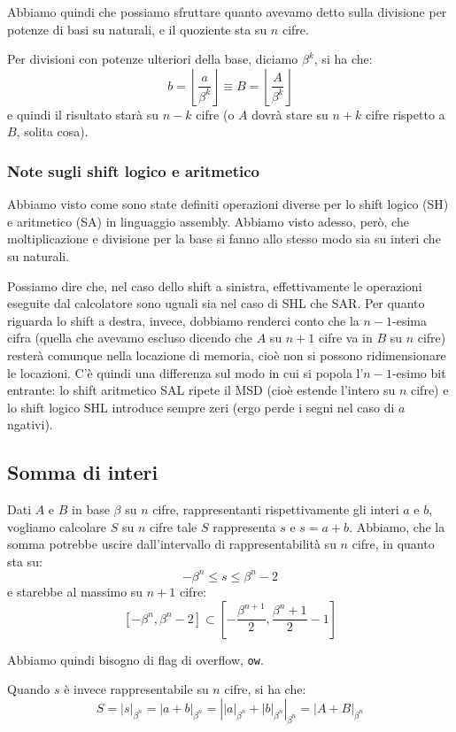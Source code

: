 \documentclass[a4paper,11pt]{article}
\begin{document}
Abbiamo quindi che possiamo sfruttare quanto avevamo detto sulla divisione per potenze di basi su naturali, e il quoziente sta su $n$ cifre.

Per divisioni con potenze ulteriori della base, diciamo $\beta^k$, si ha che:
$$
b = \left\lfloor \frac{a}{\beta^k} \right\rfloor \equiv B = \left\lfloor \frac{A}{\beta^k} \right\rfloor 
$$
e quindi il risultato starà su $n - k$ cifre (o $A$ dovrà stare su $n + k$ cifre rispetto a $B$, solita cosa).

\subsubsection{Note sugli shift logico e aritmetico}
Abbiamo visto come sono state definiti operazioni diverse per lo shift logico (SH) e aritmetico (SA) in linguaggio assembly.
Abbiamo visto adesso, però, che moltiplicazione e divisione per la base si fanno allo stesso modo sia su interi che su naturali.

Possiamo dire che, nel caso dello shift a sinistra, effettivamente le operazioni eseguite dal calcolatore sono uguali sia nel caso di SHL che SAR.
Per quanto riguarda lo shift a destra, invece, dobbiamo renderci conto che la $n-1$-esima cifra (quella che avevamo escluso dicendo che $A$ su $n+1$ cifre va in $B$ su $n$ cifre) resterà comunque nella locazione di memoria, cioè non si possono ridimensionare le locazioni.
C'è quindi una differenza sul modo in cui si popola l'$n-1$-esimo bit entrante: lo shift aritmetico SAL ripete il MSD (cioè estende l'intero su $n$ cifre) e lo shift logico SHL introduce sempre zeri (ergo perde i segni nel caso di $a$ ngativi).

\subsection{Somma di interi}
Dati $A$ e $B$ in base $\beta$ su $n$ cifre, rappresentanti rispettivamente gli interi $a$ e $b$, vogliamo calcolare $S$ su $n$ cifre tale $S$ rappresenta $s$ e $s = a + b$.
Abbiamo, che la somma potrebbe uscire dall'intervallo di rappresentabilità su $n$ cifre, in quanto sta su:
$$
-\beta^n \leq s \leq \beta^n -2
$$
e starebbe al massimo su $n + 1$ cifre:
$$
\left[ -\beta^n, \beta^n -2 \right] \subset \left[ -\frac{\beta^{n+1}}{2}, \frac{\beta^n+1}{2} - 1 \right]
$$

Abbiamo quindi bisogno di flag di overflow, \lstinline|ow|.

Quando $s$ è invece rappresentabile su $n$ cifre, si ha che:
$$
S = |s|_{\beta^n} = |a+b|_{\beta^n} = \left| |a|_{\beta^n} + |b|_{\beta^n} \right|_{\beta^n} = | A + B |_{\beta^n}
$$
\end{document}
